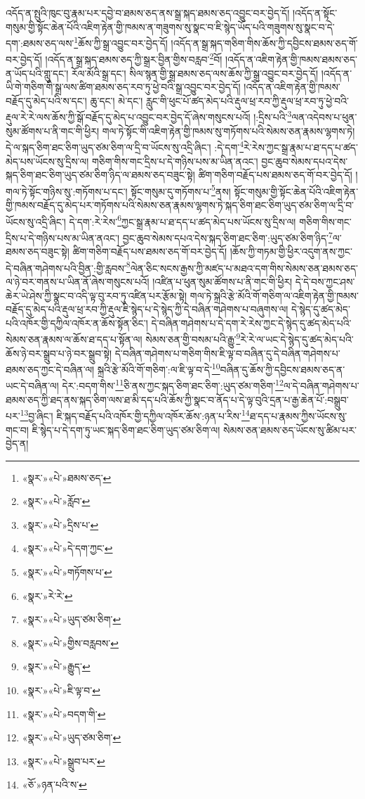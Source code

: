 འདོད་ན་སྤུའི་ཁུང་བུ་རྣམ་པར་དབྱེ་བ་ཐམས་ཅད་ནས་སྒྲ་སྐད་ཐམས་ཅད་འབྱུང་བར་བྱེད་དོ། །འདོད་ན་སྟོང་གསུམ་གྱི་སྟོང་ཆེན་པོའི་འཇིག་རྟེན་གྱི་ཁམས་ན་གཟུགས་སུ་སྣང་བ་ཇི་སྙེད་ཡོད་པའི་གཟུགས་སུ་སྣང་བ་དེ་དག་:ཐམས་ཅད་ལས་\footnote{«སྣར་»«པེ་»ཐམས་ཅད་}ཆོས་ཀྱི་སྒྲ་འབྱུང་བར་བྱེད་དོ། །འདོད་ན་སྒྲ་སྐད་གཅིག་གིས་ཆོས་ཀྱི་དབྱིངས་ཐམས་ཅད་གོ་བར་བྱེད་དོ། །འདོད་ན་སྒྲ་སྐད་ཐམས་ཅད་ཀྱི་སྒྲར་བྱིན་གྱིས་བརླབ་\footnote{«སྣར་»«པེ་»རློབ་}བོ། །འདོད་ན་འཇིག་རྟེན་གྱི་ཁམས་ཐམས་ཅད་ན་ཡོད་པའི་གླུ་དང་། རོལ་མོའི་སྒྲ་དང་། སིལ་སྙན་གྱི་སྒྲ་ཐམས་ཅད་ལས་ཆོས་ཀྱི་སྒྲ་འབྱུང་བར་བྱེད་དོ། །འདོད་ན་ཡི་གེ་གཅིག་གི་སྒྲ་ལས་ཚིག་ཐམས་ཅད་རབ་ཏུ་ཕྱེ་བའི་སྒྲ་འབྱུང་བར་བྱེད་དོ། །འདོད་ན་འཇིག་རྟེན་གྱི་ཁམས་བརྗོད་དུ་མེད་པའི་ས་དང་། ཆུ་དང་། མེ་དང་། རླུང་གི་ཕུང་པོ་ཚད་མེད་པའི་རྡུལ་ཕྲ་རབ་ཀྱི་རྡུལ་ཕྲ་རབ་ཏུ་ཕྱེ་བའི་རྡུལ་རེ་རེ་ལས་ཆོས་ཀྱི་སྒོ་བརྗོད་དུ་མེད་པ་འབྱུང་བར་བྱེད་དོ་ཞེས་གསུངས་པའོ། །:དྲིས་པའི་\footnote{«སྣར་»«པེ་»དྲིས་པ་}ལན་འདེབས་པ་ཕུན་སུམ་ཚོགས་པ་ནི་གང་གི་ཕྱིར། གལ་ཏེ་སྟོང་གི་འཇིག་རྟེན་གྱི་ཁམས་སུ་གཏོགས་པའི་སེམས་ཅན་རྣམས་ལྷགས་ཏེ། དེ་ལ་སྐད་ཅིག་ཐང་ཅིག་ཡུད་ཙམ་ཅིག་ལ་དྲི་བ་ཡོངས་སུ་འདྲི་ཞིང་། :དེ་དག་\footnote{«སྣར་»«པེ་»དེ་དག་ཀྱང་}རེ་རེས་ཀྱང་སྒྲ་རྣམ་པ་ཐ་དད་པ་ཚད་མེད་པས་ཡོངས་སུ་དྲིས་ལ། གཅིག་གིས་གང་དྲིས་པ་དེ་གཉིས་པས་མ་ཡིན་ནའང་། བྱང་ཆུབ་སེམས་དཔའ་དེས་སྐད་ཅིག་ཐང་ཅིག་ཡུད་ཙམ་ཅིག་ཉིད་ལ་ཐམས་ཅད་བཟུང་སྟེ། ཚིག་གཅིག་བརྗོད་པས་ཐམས་ཅད་གོ་བར་བྱེད་དོ། །གལ་ཏེ་སྟོང་གཉིས་སུ་:གཏོགས་པ་དང་། སྟོང་གསུམ་དུ་གཏོགས་པ་\footnote{«སྣར་»«པེ་»གཏོགས་པ་}ནས། སྟོང་གསུམ་གྱི་སྟོང་ཆེན་པོའི་འཇིག་རྟེན་གྱི་ཁམས་བརྗོད་དུ་མེད་པར་གཏོགས་པའི་སེམས་ཅན་རྣམས་ལྷགས་ཏེ་སྐད་ཅིག་ཐང་ཅིག་ཡུད་ཙམ་ཅིག་ལ་དྲི་བ་ཡོངས་སུ་འདྲི་ཞིང་། དེ་དག་:རེ་རེས་\footnote{«སྣར་»རེ་རེ་}ཀྱང་སྒྲ་རྣམ་པ་ཐ་དད་པ་ཚད་མེད་པས་ཡོངས་སུ་དྲིས་ལ། གཅིག་གིས་གང་དྲིས་པ་དེ་གཉིས་པས་མ་ཡིན་ནའང་། བྱང་ཆུབ་སེམས་དཔའ་དེས་སྐད་ཅིག་ཐང་ཅིག་:ཡུད་ཙམ་ཅིག་ཉིད་\footnote{«སྣར་»«པེ་»ཡུད་ཙམ་ཅིག་}ལ་ཐམས་ཅད་བཟུང་སྟེ། ཚིག་གཅིག་བརྗོད་པས་ཐམས་ཅད་གོ་བར་བྱེད་དོ། །ཆོས་ཀྱི་གཏམ་གྱི་ཕྱིར་འདུག་ནས་ཀྱང་དེ་བཞིན་གཤེགས་པའི་བྱིན་:གྱི་རླབས་\footnote{«སྣར་»«པེ་»གྱིས་བརླབས་}ལེན་ཅིང་སངས་རྒྱས་ཀྱི་མཛད་པ་མཐའ་དག་གིས་སེམས་ཅན་ཐམས་ཅད་ལ་ཉེ་བར་གནས་པ་ཡིན་ནོ་ཞེས་གསུངས་པའོ། །འཛིན་པ་ཕུན་སུམ་ཚོགས་པ་ནི་གང་གི་ཕྱིར། དེ་དེ་བས་ཀྱང་ཤས་ཆེར་ཡེ་ཤེས་ཀྱི་སྣང་བ་འདི་ལྟ་བུ་རབ་ཏུ་འཛིན་པར་རྩོམ་སྟེ། གལ་ཏེ་སྐྲའི་རྩེ་མོའི་གོ་གཅིག་ལ་འཇིག་རྟེན་གྱི་ཁམས་བརྗོད་དུ་མེད་པའི་རྡུལ་ཕྲ་རབ་ཀྱི་རྡུལ་ཇི་སྙེད་པ་དེ་སྙེད་ཀྱི་དེ་བཞིན་གཤེགས་པ་བཞུགས་ལ། དེ་སྙེད་དུ་ཚད་མེད་པའི་འཁོར་གྱི་དཀྱིལ་འཁོར་ན་ཆོས་སྟོན་ཅིང་། དེ་བཞིན་གཤེགས་པ་དེ་དག་རེ་རེས་ཀྱང་དེ་སྙེད་དུ་ཚད་མེད་པའི་སེམས་ཅན་རྣམས་ལ་ཆོས་ཐ་དད་པ་སྟོན་ལ། སེམས་ཅན་གྱི་བསམ་པའི་རྒྱུ་\footnote{«སྣར་»«པེ་»རྒྱུད་}རེ་རེ་ལ་ཡང་དེ་སྙེད་དུ་ཚད་མེད་པའི་ཆོས་ཉེ་བར་སྒྲུབ་པ་ཉེ་བར་སྒྲུབ་སྟེ། དེ་བཞིན་གཤེགས་པ་གཅིག་གིས་ཇི་ལྟ་བ་བཞིན་དུ་དེ་བཞིན་གཤེགས་པ་ཐམས་ཅད་ཀྱང་དེ་བཞིན་ལ། སྐྲའི་རྩེ་མོའི་གོ་གཅིག་:ལ་ཇི་ལྟ་བ་དེ་\footnote{«སྣར་»«པེ་»ཇི་ལྟ་བ་}བཞིན་དུ་ཆོས་ཀྱི་དབྱིངས་ཐམས་ཅད་ན་ཡང་དེ་བཞིན་ལ། དེར་:བདག་གིས་\footnote{«སྣར་»«པེ་»བདག་གི་}ཅི་ནས་ཀྱང་སྐད་ཅིག་ཐང་ཅིག་:ཡུད་ཙམ་གཅིག་\footnote{«སྣར་»«པེ་»ཡུད་ཙམ་ཅིག་}ལ་དེ་བཞིན་གཤེགས་པ་ཐམས་ཅད་ཀྱི་ཐད་ནས་སྐད་ཅིག་ལས་ཐ་མི་དད་པའི་ཆོས་ཀྱི་སྣང་བ་ནོད་པ་དེ་ལྟ་བུའི་དྲན་པ་རྒྱ་ཆེན་པོ་:བསྒྲུབ་པར་\footnote{«སྣར་»«པེ་»སྒྲུབ་པར་}བྱ་ཞིང་། ཇི་སྐད་བརྗོད་པའི་འཁོར་གྱི་དཀྱིལ་འཁོར་ཆོས་:ཉན་པ་རིས་\footnote{«ཅོ་»ཉན་པའི་ས་}ཐ་དད་པ་རྣམས་ཀྱིས་ཡོངས་སུ་གང་བ། ཇི་སྙེད་པ་དེ་དག་ཏུ་ཡང་སྐད་ཅིག་ཐང་ཅིག་ཡུད་ཙམ་ཅིག་ལ། སེམས་ཅན་ཐམས་ཅད་ཡོངས་སུ་ཚིམ་པར་བྱེད་ན། 
